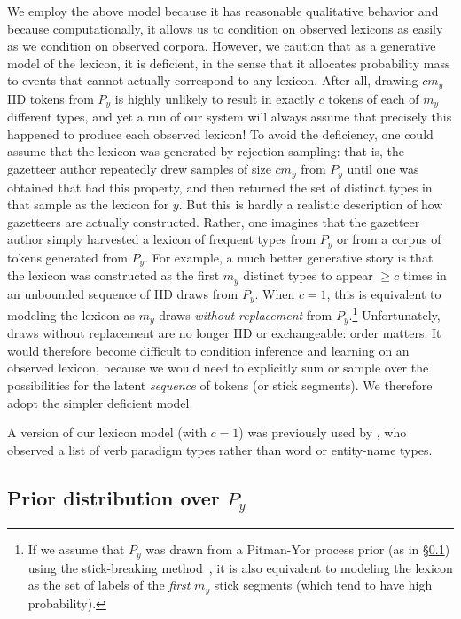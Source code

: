 \documentclass[11pt]{article}
\begin{document}
We employ the above model because it has reasonable qualitative behavior and because computationally, it allows us to condition on observed lexicons as easily as we condition on observed corpora.  However, we caution that as a generative model of the lexicon, it is deficient, in the sense that it allocates probability mass to events that cannot actually correspond to any lexicon.  After all, drawing $cm_y$ IID tokens from $P_y$ is highly unlikely to result in exactly $c$ tokens of each of $m_y$ different types, and yet a run of our system will always assume that precisely this happened to produce each observed lexicon!  To avoid the deficiency, one could assume that the lexicon was generated by rejection sampling: that is, the gazetteer author repeatedly drew samples of size $cm_y$ from $P_y$ until one was obtained that had this property, and then returned the  set of distinct types in that sample as the lexicon for $y$.  But this is hardly a realistic description of how gazetteers are actually constructed.  Rather, one imagines that the gazetteer author simply harvested a lexicon of frequent types from $P_y$ or from a corpus of tokens generated from $P_y$.  For example, a much better generative story is that the lexicon was constructed as the first $m_y$ distinct types to appear $\geq c$ times in an unbounded sequence of IID draws from $P_y$.  When $c=1$, this is equivalent to modeling the lexicon as $m_y$ draws {\em without replacement} from $P_y$.\footnote{If we assume that $P_y$ was drawn from a Pitman-Yor process prior (as in \S\ref{sec:pyp}) using the stick-breaking method~\cite{pitman-1996}, it is also equivalent to modeling the lexicon as the set of labels of the {\em first} $m_y$ stick segments (which tend to have high probability).}  Unfortunately, draws without replacement are no longer IID or exchangeable: order matters.  It would therefore become difficult to condition inference and learning on an observed lexicon, because we would need to explicitly sum or sample over the possibilities for the latent {\em sequence} of tokens (or stick segments).  We therefore adopt the simpler deficient model.

A version of our lexicon model (with $c=1$) was previously used by , who observed a list of verb paradigm types rather than word or entity-name types.

\subsection{Prior distribution over $P_y$}\label{sec:pyp}
\end{document}
